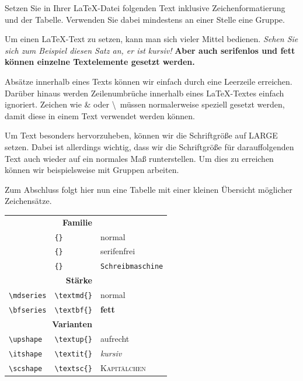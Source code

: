 \documentclass[11pt]{uebungsblatt}
\begin{document}
\begin{aufgabe}
	Setzen Sie in Ihrer \LaTeX-Datei folgenden Text inklusive Zeichenformatierung und der Tabelle. Verwenden Sie dabei mindestens an einer Stelle eine Gruppe.

	\bigskip
	Um einen \LaTeX-Text zu setzen, kann man sich vieler Mittel bedienen.
	\textit{Sehen Sie sich zum Beispiel diesen Satz an, er ist kursiv!}
	\textsf{\textbf{Aber auch serifenlos und fett können einzelne Textelemente gesetzt werden.}}

	Absätze innerhalb eines Texts können wir einfach durch eine Leerzeile erreichen.
	Darüber hinaus werden Zeilenumbrüche innerhalb eines \LaTeX-Textes einfach ignoriert.
	Zeichen wie \& oder \textbackslash\ müssen normalerweise speziell gesetzt werden,
	damit diese in einem Text verwendet werden können.

	\begingroup
	\LARGE
	Um Text besonders hervorzuheben, können wir die Schriftgröße auf LARGE setzen.
	\endgroup
	Dabei ist allerdings wichtig, dass wir die Schriftgröße für darauffolgenden Text auch wieder auf ein normales Maß runterstellen.
	Um dies zu erreichen können wir beispielsweise mit Gruppen arbeiten.

	Zum Abschluss folgt hier nun eine Tabelle mit einer kleinen Übersicht möglicher Zeichensätze.

	\begin{table}[H]
		\centering
		\begin{tabular}{lll}
			\multicolumn{2}{r}{\textbf{Familie}}                                                              \\
			\texttt{\string\rmfamily} & \texttt{\string\textrm\{\}} & \textrm{normal}                         \\
			\texttt{\string\sffamily} & \texttt{\string\textsf\{\}} & \textsf{serifenfrei}                    \\
			\texttt{\string\ttfamily} & \texttt{\string\texttt\{\}} & \texttt{Schreibmaschine} \vspace{0.5cm} \\
			\multicolumn{2}{r}{\textbf{Stärke}}                                                               \\
			\verb|\mdseries|          & \verb|\textmd{}|            & \textmd{normal}                         \\
			\verb|\bfseries|          & \verb|\textbf{}|            & \textbf{fett} \vspace{0.5cm}            \\
			\multicolumn{2}{r}{\textbf{Varianten}}                                                            \\
			\verb|\upshape|           & \verb|\textup{}|            & \textup{aufrecht}                       \\
			\verb|\itshape|           & \verb|\textit{}|            & \textit{kursiv}                         \\
			\verb|\scshape|           & \verb|\textsc{}|            & \textsc{Kapitälchen}                    \\
		\end{tabular}
	\end{table}
\end{aufgabe}
\end{document}
